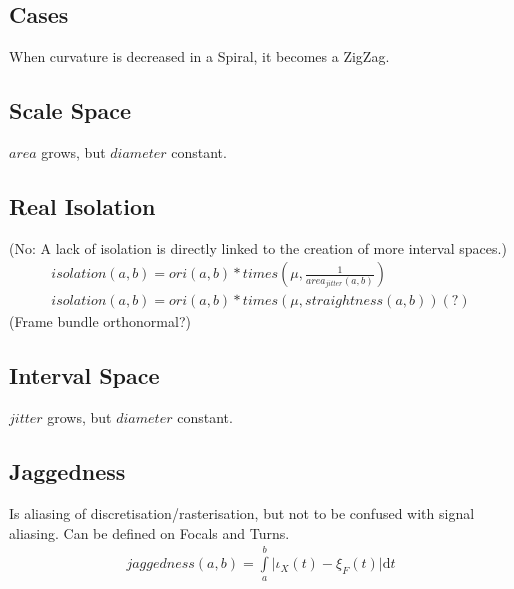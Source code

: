 \documentclass{report}
\begin{document}
\subsection*{Cases}
When curvature is decreased in a Spiral, it becomes a ZigZag.
\subsection*{Scale Space}
$area$ grows, but $diameter$ constant.

\subsection{Real Isolation}
(No: A lack of isolation is directly linked to the creation of more interval spaces.)
\begin{align}
isolation(a,b) = ori(a,b)*times(\mu,\frac{1}{area_{jitter}(a,b)})\\
isolation(a,b) = ori(a,b)*times(\mu,straightness(a,b))(?)
\end{align}
(Frame bundle orthonormal?)
\subsection*{Interval Space}
$jitter$ grows, but $diameter$ constant.

\subsection{Jaggedness}
Is aliasing of discretisation/rasterisation, but not to be confused with signal aliasing. Can be defined on Focals and Turns.
\begin{align}
jaggedness(a,b)=\int \limits _{a}^{b} \lvert \iota_{X}(t)-\xi_{F}(t)\rvert \mathrm{d}t
\end{align}
\end{document}
